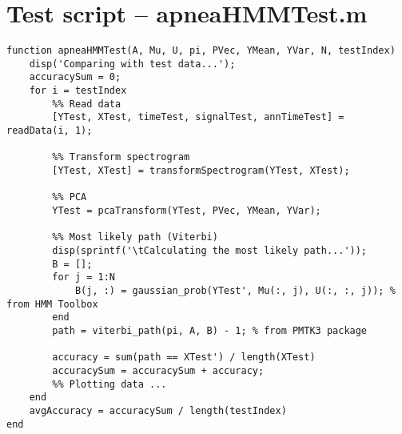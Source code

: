 \section{Test script -- apneaHMMTest.m}
\label{sec:apneaHMMTest}
\begin{lstlisting}
function apneaHMMTest(A, Mu, U, pi, PVec, YMean, YVar, N, testIndex)
    disp('Comparing with test data...');
    accuracySum = 0;
    for i = testIndex
        %% Read data
        [YTest, XTest, timeTest, signalTest, annTimeTest] = readData(i, 1);
        
        %% Transform spectrogram
        [YTest, XTest] = transformSpectrogram(YTest, XTest);
        
        %% PCA
        YTest = pcaTransform(YTest, PVec, YMean, YVar);

        %% Most likely path (Viterbi)
        disp(sprintf('\tCalculating the most likely path...'));
        B = [];
        for j = 1:N
            B(j, :) = gaussian_prob(YTest', Mu(:, j), U(:, :, j)); % from HMM Toolbox
        end
        path = viterbi_path(pi, A, B) - 1; % from PMTK3 package
        
        accuracy = sum(path == XTest') / length(XTest)
        accuracySum = accuracySum + accuracy;
        %% Plotting data ...
    end
    avgAccuracy = accuracySum / length(testIndex)
end
\end{lstlisting}